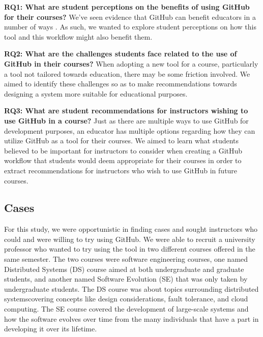 \textbf{RQ1: What are student perceptions on the benefits of using GitHub for their courses?} We've seen evidence that GitHub can benefit educators in a number of ways \cite{zagalsky2015emergence}. As such, we wanted to explore student perceptions on how this tool and this workflow might also benefit them.

\textbf{RQ2: What are the challenges students face related to the use of GitHub in their courses?} When adopting a new tool for a course, particularly a tool not tailored towards education, there may be some friction involved. We aimed to identify these challenges so as to make recommendations towards designing a system more suitable for educational purposes.

\textbf{RQ3: What are student recommendations for instructors wishing to use GitHub in a course?} Just as there are multiple ways to use GitHub for development purposes, an educator has multiple options regarding how they can utilize GitHub as a tool for their courses. We aimed to learn what students believed to be important for instructors to consider when creating a GitHub workflow that students would deem appropriate for their courses in order to extract recommendations for instructors who wish to use GitHub in future courses.

\subsection{Cases}
For this study, we were opportunistic in finding cases and sought instructors who could and were willing to try using GitHub. We were able to recruit a university professor who wanted to try using the tool in two different courses offered in the same semester. The two courses were software engineering courses, one named Distributed Systems (DS) course aimed at both undergraduate and graduate students, and another named Software Evolution (SE) that was only taken by undergraduate students. The DS course was about topics surrounding distributed systemscovering concepts like design considerations, fault tolerance, and cloud computing. The SE course covered the development of large-scale systems and how the software evolves over time from the many individuals that have a part in developing it over its lifetime.

